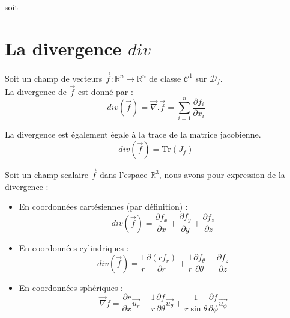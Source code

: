 \begin{demo}
soit
\end{demo}
\section{La divergence $div$}
\begin{defi}
Soit un champ de vecteurs $\overrightarrow{f}:\mathbb{R}^n\mapsto\mathbb{R}^n$ de classe $\mathscr{C}^1$ sur $\mathscr{D}_f$.\\
La divergence de $\overrightarrow{f}$ est donné par :
$$div(\overrightarrow{f})=\overrightarrow{\nabla}.\overrightarrow{f}=\sum_{i=1}^n \frac{\partial f_i}{\partial x_i}$$
\end{defi}
\begin{rmq}
La divergence est également égale à la trace de la matrice jacobienne.
$$div(\overrightarrow{f})=\text{Tr}(J_f)$$
\end{rmq}
\begin{prop}
Soit un champ scalaire $\overrightarrow{f}$ dans l'espace $\mathbb{R}^3$, nous avons pour expression de la divergence :
\begin{itemize}
    \item En coordonnées cartésiennes (par définition) : $$div(\overrightarrow{f})=\frac{\partial f_x}{\partial x}+\frac{\partial f_y}{\partial y}+\frac{\partial f_z}{\partial z}$$
    \item En coordonnées cylindriques : $$div(\overrightarrow{f})=\frac{1}{r}\frac{\partial (r f_r)}{\partial r}+\frac{1}{r}\frac{\partial f_{\theta}}{\partial \theta}+\frac{\partial f_z}{\partial z}$$
    \item En coordonnées sphériques : $$\overrightarrow{\nabla}f=\frac{\partial r}{\partial x}\overrightarrow{u_r}+\frac{1}{r}\frac{\partial f}{\partial \theta}\overrightarrow{u_\theta}+\frac{1}{r\sin{\theta}}\frac{\partial f}{\partial \phi}\overrightarrow{u_\phi}$$
\end{itemize}
\end{prop}
\begin{thm}

\end{thm}
